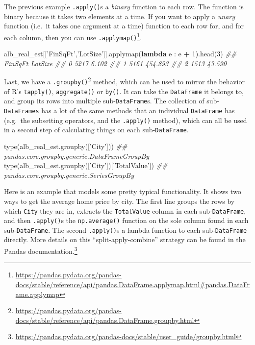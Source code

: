 \documentclass[12pt,krantz2]{krantz}
\makeatletter
\newenvironment{Shaded}{\begin{snugshade}}{\end{snugshade}}
\newcommand{\BuiltInTok}[1]{#1}
\newcommand{\CommentTok}[1]{\textcolor[rgb]{0.37,0.37,0.37}{\textit{#1}}}
\newcommand{\DecValTok}[1]{\textcolor[rgb]{0.06,0.06,0.06}{#1}}
\newcommand{\KeywordTok}[1]{\textcolor[rgb]{0.27,0.27,0.27}{\textbf{#1}}}
\newcommand{\NormalTok}[1]{#1}
\newcommand{\OperatorTok}[1]{\textcolor[rgb]{0.43,0.43,0.43}{\textbf{#1}}}
\newcommand{\StringTok}[1]{\textcolor[rgb]{0.5,0.5,0.5}{#1}}
\renewcommand{\href}[2]{#2\footnote{\url{#1}}}
\newenvironment{kframe}{%
\medskip{}
\setlength{\fboxsep}{.8em}
 \def\at@end@of@kframe{}%
 \ifinner\ifhmode%
  \def\at@end@of@kframe{\end{minipage}}%
  \begin{minipage}{\columnwidth}%
 \fi\fi%
 \def\FrameCommand##1{\hskip\@totalleftmargin \hskip-\fboxsep
 \colorbox{shadecolor}{##1}\hskip-\fboxsep
     \hskip-\linewidth \hskip-\@totalleftmargin \hskip\columnwidth}%
 \MakeFramed {\advance\hsize-\width
   \@totalleftmargin\z@ \linewidth\hsize
   \@setminipage}}%
 {\par\unskip\endMakeFramed%
 \at@end@of@kframe}
\renewenvironment{Shaded}{\begin{kframe}}{\end{kframe}}
\makeatother
\begin{document}
The previous example \texttt{.apply()}s a \emph{binary} function to each row. The function is binary because it takes two elements at a time. If you want to apply a \emph{unary} function (i.e.~it takes one argument at a time) function to each row for, and for each column, then you can use \href{https://pandas.pydata.org/pandas-docs/stable/reference/api/pandas.DataFrame.applymap.html\#pandas.DataFrame.applymap}{\texttt{.applymap()}}.

\begin{Shaded}
\begin{Highlighting}[]
\NormalTok{alb_real_est[[}\StringTok{'FinSqFt'}\NormalTok{,}\StringTok{'LotSize'}\NormalTok{]].applymap(}\KeywordTok{lambda}\NormalTok{ e : e }\OperatorTok{+} \DecValTok{1}\NormalTok{).head(}\DecValTok{3}\NormalTok{)}
\CommentTok{##    FinSqFt  LotSize}
\CommentTok{## 0     5217    6.102}
\CommentTok{## 1     5161  454.893}
\CommentTok{## 2     1513   43.590}
\end{Highlighting}
\end{Shaded}

Last, we have a \href{https://pandas.pydata.org/pandas-docs/stable/reference/api/pandas.DataFrame.groupby.html}{\texttt{.groupby()}} method, which can be used to mirror the behavior of R's \texttt{tapply()}, \texttt{aggregate()} or \texttt{by()}. It can take the \texttt{DataFrame} it belongs to, and group its rows into multiple sub-\texttt{DataFrame}s. The collection of sub-\texttt{DataFrames} has a lot of the same methods that an individual \texttt{DataFrame} has (e.g.~the subsetting operators, and the \texttt{.apply()} method), which can all be used in a second step of calculating things on each sub-\texttt{DataFrame}.

\begin{Shaded}
\begin{Highlighting}[]
\BuiltInTok{type}\NormalTok{(alb_real_est.groupby([}\StringTok{'City'}\NormalTok{]))}
\CommentTok{## pandas.core.groupby.generic.DataFrameGroupBy}
\BuiltInTok{type}\NormalTok{(alb_real_est.groupby([}\StringTok{'City'}\NormalTok{])[}\StringTok{'TotalValue'}\NormalTok{])}
\CommentTok{## pandas.core.groupby.generic.SeriesGroupBy}
\end{Highlighting}
\end{Shaded}

Here is an example that models some pretty typical functionality. It shows two ways to get the average home price by city. The first line groups the rows by which \texttt{City} they are in, extracts the \texttt{TotalValue} column in each sub-\texttt{DataFrame}, and then \texttt{.apply()}s the \texttt{np.average()} function on the sole column found in each sub-\texttt{DataFrame}. The second \texttt{.apply()}s a lambda function to each sub-\texttt{DataFrame} directly. More details on this ``split-apply-combine'' strategy can be found in the \href{https://pandas.pydata.org/pandas-docs/stable/user_guide/groupby.html}{Pandas documentation.}
\end{document}
